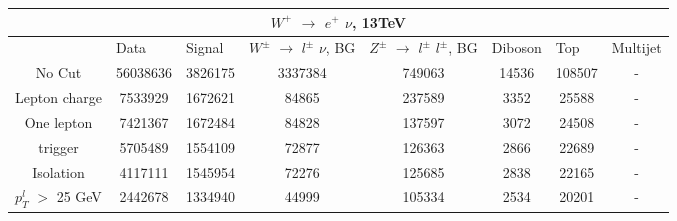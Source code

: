 \documentclass[10pt]{article}
\begin{document}
 										
\begin{center}										
\begin{table}[H] 										
\begin{adjustbox}{width=1\textwidth}								
\begin{tabular}{cccccccc} 									
\\ \hline \hline  										
\multicolumn{8}{c}{$W^{+}$ $\rightarrow$ $e^{+}$ $\nu$, 13TeV}  									
\\ \hline \hline                            						
\multicolumn{1}{|c|}{}   & \multicolumn{1}{l|}{Data} & \multicolumn{1}{l|}{Signal} & \multicolumn{1}{l|}{$W^{\pm}$ $\rightarrow$ $l^{\pm}$ $\nu$, BG} & \multicolumn{1}{l|}{$Z^{\pm}$ $\rightarrow$ $l^{\pm}$ $l^{\pm}$, BG} & \multicolumn{1}{l|}{Diboson} & \multicolumn{1}{l|}{Top} & \multicolumn{1}{l|}{Multijet} \\ \hline 
\multicolumn{1}{|c|}{No Cut}  & \multicolumn{1}{c|}{56038636} & \multicolumn{1}{c|}{3826175} & \multicolumn{1}{c|}{3337384} & \multicolumn{1}{c|}{749063} & \multicolumn{1}{c|}{14536} & \multicolumn{1}{c|}{108507} & \multicolumn{1}{c|}{-}  \\ \hline 
\multicolumn{1}{|c|}{Lepton charge}  & \multicolumn{1}{c|}{7533929} & \multicolumn{1}{c|}{1672621} & \multicolumn{1}{c|}{84865} & \multicolumn{1}{c|}{237589} & \multicolumn{1}{c|}{3352} & \multicolumn{1}{c|}{25588} & \multicolumn{1}{c|}{-}  \\ \hline 
\multicolumn{1}{|c|}{One lepton}  & \multicolumn{1}{c|}{7421367} & \multicolumn{1}{c|}{1672484} & \multicolumn{1}{c|}{84828} & \multicolumn{1}{c|}{137597} & \multicolumn{1}{c|}{3072} & \multicolumn{1}{c|}{24508} & \multicolumn{1}{c|}{-}  \\ \hline 
\multicolumn{1}{|c|}{trigger}  & \multicolumn{1}{c|}{5705489} & \multicolumn{1}{c|}{1554109} & \multicolumn{1}{c|}{72877} & \multicolumn{1}{c|}{126363} & \multicolumn{1}{c|}{2866} & \multicolumn{1}{c|}{22689} & \multicolumn{1}{c|}{-}  \\ \hline 
\multicolumn{1}{|c|}{Isolation}  & \multicolumn{1}{c|}{4117111} & \multicolumn{1}{c|}{1545954} & \multicolumn{1}{c|}{72276} & \multicolumn{1}{c|}{125685} & \multicolumn{1}{c|}{2838} & \multicolumn{1}{c|}{22165} & \multicolumn{1}{c|}{-}  \\ \hline 
\multicolumn{1}{|c|}{$p_{T}^{l}$ $>$ 25 GeV}  & \multicolumn{1}{c|}{2442678} & \multicolumn{1}{c|}{1334940} & \multicolumn{1}{c|}{44999} & \multicolumn{1}{c|}{105334} & \multicolumn{1}{c|}{2534} & \multicolumn{1}{c|}{20201} & \multicolumn{1}{c|}{-}  \\ \hline 

\end{tabular}
\end{adjustbox}
\end{table}
\end{center}
\end{document}
